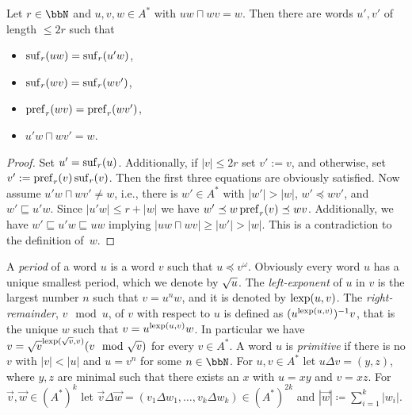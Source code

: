 \begin{lemma}\label{lem:short_ends_construction}
	Let $r\in\bbN$ and $u,v,w \in A^\ast$ with $uw\sqcap wv = w$. %
	Then there are words $u',v'$ of length $\leq 2r$ such that 
	
	\begin{minipage}{0.45\linewidth}
	\begin{itemize}
		\item $\operatorname{suf}_r(uw) = \operatorname{suf}_r(u'w)$,
		\item $\operatorname{suf}_r(wv) = \operatorname{suf}_r(wv')$,
	\end{itemize}
    \end{minipage}
    \begin{minipage}{0.45\linewidth}
    	\begin{itemize}
    		\item $\operatorname{pref}_r(wv) = \operatorname{pref}_r(wv')$,
    		\item $u'w\sqcap wv' = w$.
    	\end{itemize}
    \end{minipage}
\end{lemma}
\begin{proof}
	Set $u'=\operatorname{suf}_r(u)$. Additionally, if $|v|\leq 2r$ set $v':=v$, and otherwise, set $v':=\operatorname{pref}_r(v)\operatorname{suf}_r(v)$. Then the first three equations are obviously satisfied. Now assume $u'w\sqcap wv'\neq w$, i.e., there is $w'\in A^*$ with $|w'|>|w|$, $w'\preceq wv'$, and $w'\sqsubseteq u'w$. Since $|u'w|\leq r+|w|$ we have $w'\preceq w\operatorname{pref}_r(v)\preceq wv$. Additionally, we have $w'\sqsubseteq u'w\sqsubseteq uw$ implying $|uw\sqcap wv|\geq|w'|>|w|$. This is a contradiction to the definition of~$w$.
\end{proof}

A \emph{period} of a word $u$ is a word $v$ such that $u \preceq v^\omega$. Obviously every word $u$ has a unique smallest period, which we denote by $\sqrt{u}$. The \emph{left-exponent} of $u$ in $v$ is the largest number $n$ such that $v= u^nw$, and it is denoted by $\operatorname{lexp}(u,v)$. The \emph{right-remainder}, $v\mod u$,  of $v$ with respect to $u$ is defined as $(u^{\operatorname{lexp}(u,v)})^{-1}v$, that is the unique $w$ such that $v= u^{\operatorname{lexp}(u,v)}w$.  In particular we have $v= \root{v}^{\lexp(\root{v}, v)}(v \mod \root{v})$ for every $v\in A^\ast$. A word $u$ is \emph{primitive} if there is no $v$ with
$|v| < |u|$ and $u = v^n$ for some $n\in\bbN$.
For $u,v\in A^\ast$ let $u\Delta v = (y,z)$, where $y,z$ are minimal such that there exists an $x$ with $u=xy$ and $v=xz$. For $\vec{v}, \vec{w}\in(A^\ast)^k$ let 
$\vec{v}\Delta\vec{w} = (v_1\Delta w_1,\ldots, v_k\Delta w_k) \in (A^\ast)^{2k}$ and $|\vec{w}| \coloneq \sum_{i=1}^{k}|w_i|$. 

